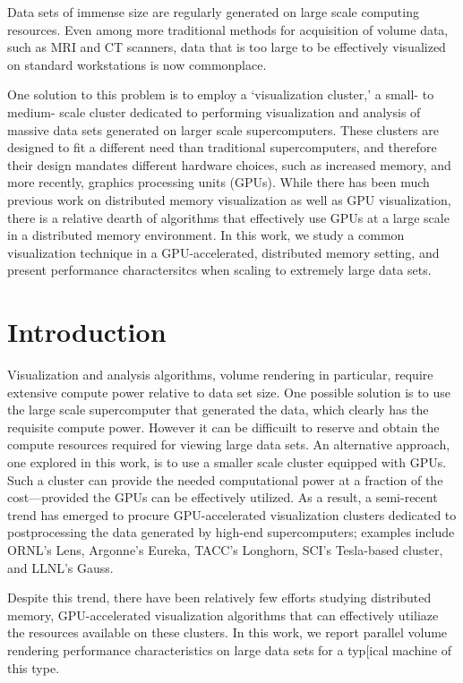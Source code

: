 Data sets of immense size are regularly generated on large scale
computing resources.  Even among more traditional methods for
acquisition of volume data, such as MRI and CT scanners, data that is
too large to be effectively visualized on standard workstations is now
commonplace.

One solution to this problem is to employ a `visualization cluster,' a
small- to medium- scale cluster dedicated to performing visualization
and analysis of massive data sets generated on larger scale
supercomputers. These clusters are designed to fit a different
need than traditional supercomputers, and therefore their design
mandates different hardware choices, such as increased memory, and
more recently, graphics processing units (GPUs).  While there has
been much previous work on distributed memory visualization as well
as GPU visualization, there is a relative dearth of algorithms
that effectively use GPUs at a large scale in a distributed memory
environment.  In this work, we study a common visualization technique
in a GPU-accelerated, distributed memory setting, and present
performance charactersitcs when scaling to extremely large data sets.

\section{Introduction}
\label{sec:introduction}

Visualization and analysis algorithms, volume rendering in particular,
require extensive compute power relative to data set size.  One
possible solution is to use the large scale supercomputer that
generated the data, which clearly has the requisite compute power.
However it can be difficuilt to reserve and obtain the compute
resources required for viewing large data sets.  An alternative
approach, one explored in this work, is to use a smaller scale
cluster equipped with GPUs.  Such a cluster can provide the needed
computational power at a fraction of the cost---provided the GPUs
can be effectively utilized.  As a result, a semi-recent trend has
emerged to procure GPU-accelerated visualization clusters dedicated
to postprocessing the data generated by high-end supercomputers;
examples include ORNL's Lens, Argonne's Eureka, TACC's Longhorn, SCI's
Tesla-based cluster, and LLNL's Gauss.

Despite this trend, there have been relatively few efforts studying distributed
memory, GPU-accelerated visualization algorithms that can effectively utiliaze
the resources available on these clusters.  In this work, we report parallel
volume rendering performance characteristics on large data sets for a typ[ical
machine of this type.

